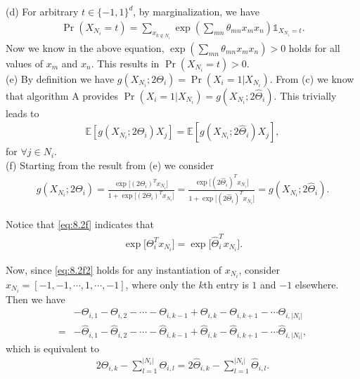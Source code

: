 \documentclass{article}
\newcommand{\qeds}{\hfill\qedsymbol}
\begin{document}
\noindent
(d)
%
For arbitrary $t\in\{-1, 1\}^d$, by marginalization, we have
\begin{align*}
	\Pr(X_{N_i} = t) = \sum_{x_{k \notin N_i}}\exp\left(\sum_{mn}\theta_{mn} x_m x_n\right)
	\mathds{1}_{X_{N_i}=t}.
\end{align*}
Now we know in the above equation, $\exp\left(\sum_{mn}\theta_{mn} x_m x_n\right) > 0$ holds for all values of
$x_m$ and $x_n$. This results in $\Pr(X_{N_i} = t) > 0$. \qeds
\\

\noindent
(e)
%
By definition we have $g(X_{N_i}; 2\Theta_i) = \Pr(X_i=1|X_{N_i})$. From (c) we know that algorithm A provides
$\Pr(X_i=1|X_{N_i}) = g(X_{N_i}; 2\hat{\Theta}_i)$. This trivially leads to 
\begin{align*}
	\mathbb{E}[g(X_{N_i}; 2\Theta_i) X_j] = 	\mathbb{E}[g(X_{N_i}; 2\hat{\Theta}_i) X_j],
\end{align*}
for $\forall j \in N_i$. \qeds
\\

\noindent
(f) Starting from the result from (e) we consider
\begin{align}
	g(X_{N_i}; 2\Theta_i) = \frac{\exp\big[(2\Theta_i)^T x_{N_i}\big]}
{1 + \exp\big[(2\Theta_i)^T x_{N_i}\big]} = \frac{\exp\big[(2\hat{\Theta}_i)^T x_{N_i}\big]}
{1 + \exp\big[(2\hat{\Theta}_i)^T x_{N_i}\big]} = g(X_{N_i}; 2\hat{\Theta}_i). \label{eq:8.2f}
\end{align}
%

Notice that \eqref{eq:8.2f} indicates that
\begin{align}
	\exp\big[\Theta_i^T x_{N_i}\big] = \exp\big[\hat{\Theta}_i^T x_{N_i}\big]. \label{eq:8.2f2}
\end{align}

Now, since \eqref{eq:8.2f2} holds for any instantiation of $x_{N_i}$, consider $x_{N_i} = [-1, -1, \cdots, 1, \cdots, -1]$, where only the $k$th entry is $1$ and $-1$ elsewhere. Then we have
\begin{align*}
	&-\Theta_{i, 1} - \Theta_{i, 2} - \cdots - \Theta_{i, k-1} + \Theta_{i, k} - \Theta_{i, k+1} - \cdots \Theta_{i, |N_i|}\\
	= &-\hat{\Theta}_{i, 1} - \hat{\Theta}_{i, 2} - \cdots - \hat{\Theta}_{i, k-1} + \hat{\Theta}_{i, k} - \hat{\Theta}_{i, k+1} - \cdots \hat{\Theta}_{i, |N_i|},
\end{align*}
%
which is equivalent to
\begin{align}
	2 \Theta_{i, k} - \sum_{l=1}^{|N_i|}\Theta_{i, l} = 2 \hat{\Theta}_{i, k} - \sum_{l=1}^{|N_i|}\hat{\Theta}_{i, l}. \label{eq:82f3}
\end{align}
\end{document}
